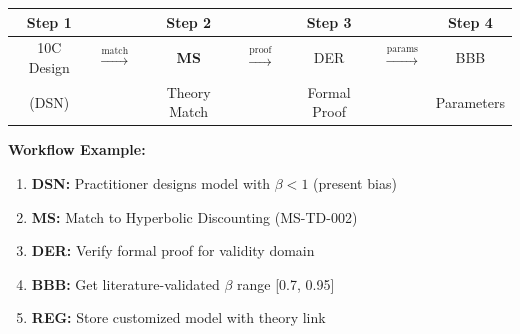 \begin{tcolorbox}[colback=green!3!white, colframe=green!60!black,
    title=\textbf{Data Flow: Hybrid Practitioner-Scientist Workflow}]

\begin{center}
\begin{tabular}{ccccccc}
\textbf{Step 1} & & \textbf{Step 2} & & \textbf{Step 3} & & \textbf{Step 4} \\
\hline
10C Design & $\xrightarrow{\text{match}}$ & \textbf{MS} & $\xrightarrow{\text{proof}}$ & DER & $\xrightarrow{\text{params}}$ & BBB \\
(DSN) & & Theory Match & & Formal Proof & & Parameters \\
\end{tabular}
\end{center}

\vspace{0.5em}

\textbf{Workflow Example:}
\begin{enumerate}[nosep]
    \item \textbf{DSN:} Practitioner designs model with $\beta < 1$ (present bias)
    \item \textbf{MS:} Match to Hyperbolic Discounting (MS-TD-002)
    \item \textbf{DER:} Verify formal proof for validity domain
    \item \textbf{BBB:} Get literature-validated $\beta$ range [0.7, 0.95]
    \item \textbf{REG:} Store customized model with theory link
\end{enumerate}

\end{tcolorbox}

